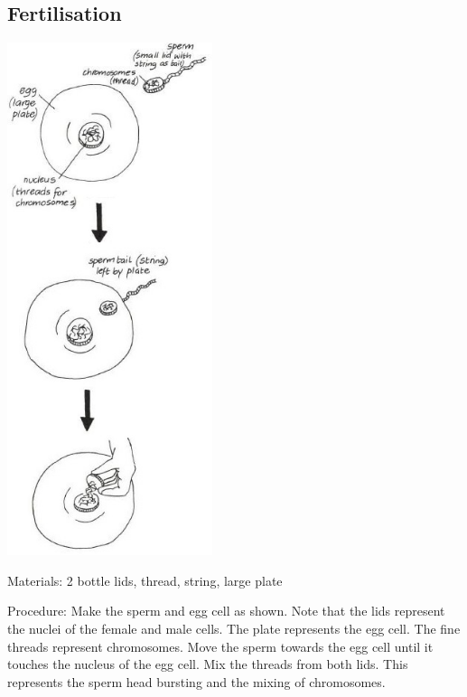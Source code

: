 \begin{multicols}{2}
\columnbreak

\subsection{Fertilisation}

\begin{center}
\includegraphics[width=0.45\textwidth]{./img/vso/fertilisation.jpg}
\end{center}

\begin{description*}
\item[Materials:]{2 bottle lids, thread, string, large plate}
\item[Procedure:]{Make the sperm and egg cell as shown. Note that the lids represent the
nuclei of the female and male cells. The plate represents the egg cell.
The fine threads represent chromosomes. Move the sperm towards the
egg cell until it touches the nucleus of the egg cell. Mix the threads
from both lids. This represents the sperm head bursting and the mixing
of chromosomes.}
\end{description*}


\end{multicols}

\pagebreak